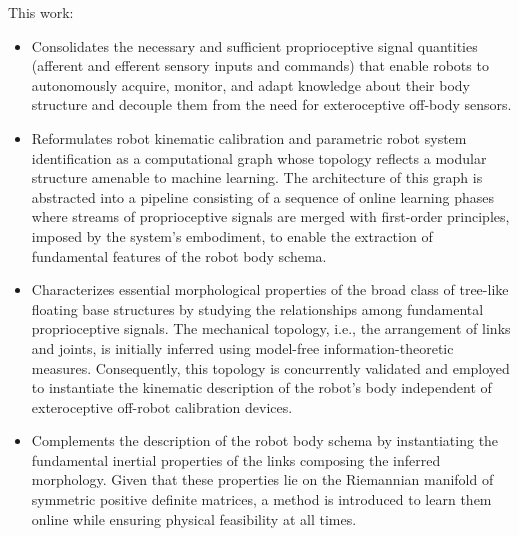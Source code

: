 \documentclass[12pt, a4paper]{article}
\begin{document}
%
This work:
\begin{itemize}
	\item Consolidates the necessary and sufficient proprioceptive signal quantities (afferent and efferent sensory inputs and commands) that enable robots to autonomously acquire, monitor, and adapt knowledge about their body structure and decouple them from the need for exteroceptive off-body sensors.
	
	\item Reformulates robot kinematic calibration and parametric robot system identification as a computational graph whose topology reflects a modular structure amenable to machine learning. The architecture of this graph is abstracted into a pipeline consisting of a sequence of online learning phases where streams of proprioceptive signals are merged with first-order principles, imposed by the system's embodiment, to enable the extraction of fundamental features of the robot body schema.
	
	\item Characterizes essential morphological properties of the broad class of tree-like floating base structures by studying the relationships among fundamental proprioceptive signals. The mechanical topology, i.e., the arrangement of links and joints, is initially inferred using model-free information-theoretic measures. Consequently, this topology is concurrently validated and employed to instantiate the kinematic description of the robot's body independent of exteroceptive off-robot calibration devices.
	
	\item Complements the description of the robot body schema by instantiating the fundamental inertial properties of the links composing the inferred morphology. Given that these properties lie on the Riemannian manifold of symmetric positive definite matrices, a method is introduced to learn them online while ensuring physical feasibility at all times.
\end{itemize}
\end{document}
